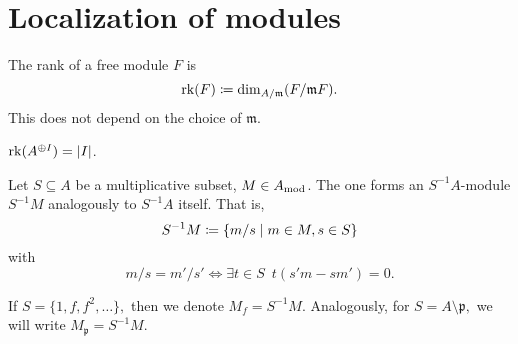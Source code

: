 \section{Localization of modules}

\begin{df}
  The rank of a free module $F$ is
  \[ \operatorname*{rk}(F) \coloneqq \dim_{A/{\mathfrak{m}}}(F / {\mathfrak m F}).\]
  This does not depend on the choice of $\mathfrak m$.
\end{df}

\begin{example}
  $ \operatorname*{rk}(A^{\oplus I}) = \lvert I\rvert$.
\end{example}

\begin{df}
  Let $S \subseteq A$ be a multiplicative subset, $M \in {A}_\mathrm{mod}$. The one forms an $S^{-1}A$-module $S^{-1}M$ analogously to $S^{-1}A$ itself. That is,
  \[ S^{-1}M \coloneqq \{ m / {s} \mathrel{|} m \in M, s \in S\}\]
  with
  \[ m / {s} = m' / {s'} \iff \exists t \in S \enspace t(s'm - sm') = 0.\]
\end{df}

\begin{example}
  If
  \( S = \{1, f, f^2, \dotsc \},\)
  then we denote
  \( M_f = S^{-1}M.\)
  Analogously, for
  \( S = A \setminus \mathfrak p,\)
  we will write
  \(M_{\mathfrak p} = S^{-1}M.\)
\end{example}




